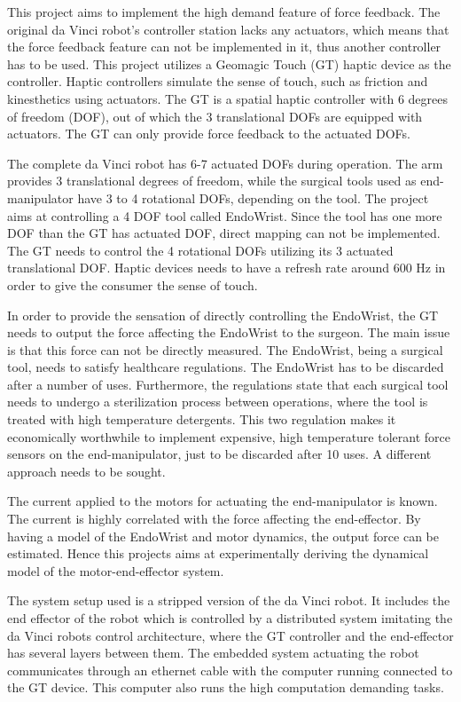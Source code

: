 This project aims to implement the high demand feature of force feedback. The original da Vinci robot's controller station lacks any actuators, which means that the force feedback feature can not be implemented in it, thus another controller has to be used. This project utilizes a Geomagic Touch (GT) haptic device as the controller. Haptic controllers simulate the sense of touch, such as friction and kinesthetics using actuators.
The GT is a spatial haptic controller with 6 degrees of freedom (DOF), out of which the 3 translational DOFs are equipped with actuators\cite{gt_spec}. The GT can only provide force feedback to the actuated DOFs.

The complete da Vinci robot has 6-7 actuated DOFs during operation. The arm provides 3 translational degrees of freedom, while the surgical tools used as end-manipulator have 3 to 4 rotational DOFs, depending on the tool. The project aims at controlling a 4 DOF tool called EndoWrist. Since the tool has one more DOF than the GT has actuated DOF, direct mapping can not be implemented. The GT needs to control the 4 rotational DOFs utilizing its 3 actuated translational DOF. Haptic devices needs to have a refresh rate around 600 Hz in order to give the consumer the sense of touch\cite{coles2011role}.%

In order to provide the sensation of directly controlling the EndoWrist, the GT needs to output the force affecting the EndoWrist to the surgeon. The main issue is that this force can not be directly measured. The EndoWrist, being a surgical tool, needs to satisfy healthcare regulations. The EndoWrist has to be discarded after a number of uses. Furthermore, the regulations state that each surgical tool needs to undergo a sterilization process between operations, where the tool is treated with high temperature detergents. This two regulation makes it economically worthwhile to implement expensive, high temperature tolerant force sensors on the end-manipulator, just to be discarded after 10 uses. A different approach needs to be sought.

The current applied to the motors for actuating the end-manipulator is known. The current is highly correlated with the force affecting the end-effector. By having a model of the EndoWrist and motor dynamics, the output force can be estimated. Hence this projects aims at experimentally deriving the dynamical model of the motor-end-effector system.

The system setup used is a stripped version of the da Vinci robot. It includes the end effector of the robot which is controlled by a distributed system imitating the da Vinci robots control architecture, where the GT controller and the end-effector has several layers between them. The embedded system actuating the robot communicates through an ethernet cable with the computer running connected to the GT device. This computer also runs the high computation demanding tasks.


